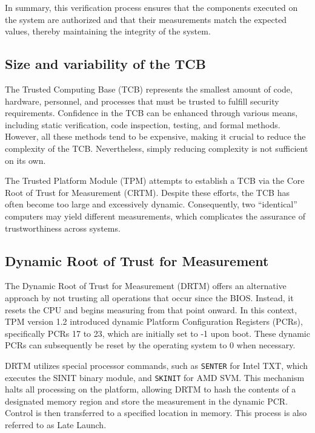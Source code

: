 In summary, this verification process ensures that the components executed on the system are authorized and that their measurements match the expected values, thereby maintaining the integrity of the system.


\subsection{Size and variability of the TCB}

The Trusted Computing Base (TCB) represents the smallest amount of code, hardware, personnel, and processes that must be trusted to fulfill security requirements. Confidence in the TCB can be enhanced through various means, including static verification, code inspection, testing, and formal methods. However, all these methods tend to be expensive, making it crucial to reduce the complexity of the TCB. Nevertheless, simply reducing complexity is not sufficient on its own.

The Trusted Platform Module (TPM) attempts to establish a TCB via the Core Root of Trust for Measurement (CRTM). Despite these efforts, the TCB has often become too large and excessively dynamic. Consequently, two “identical” computers may yield different measurements, which complicates the assurance of trustworthiness across systems.

\subsection{Dynamic Root of Trust for Measurement}

The Dynamic Root of Trust for Measurement (DRTM) offers an alternative approach by not trusting all operations that occur since the BIOS. Instead, it resets the CPU and begins measuring from that point onward. In this context, TPM version 1.2 introduced dynamic Platform Configuration Registers (PCRs), specifically PCRs 17 to 23, which are initially set to -1 upon boot. These dynamic PCRs can subsequently be reset by the operating system to 0 when necessary.

DRTM utilizes special processor commands, such as \texttt{SENTER} for Intel TXT, which executes the SINIT binary module, and \texttt{SKINIT} for AMD SVM. This mechanism halts all processing on the platform, allowing DRTM to hash the contents of a designated memory region and store the measurement in the dynamic PCR. Control is then transferred to a specified location in memory. This process is also referred to as Late Launch.

